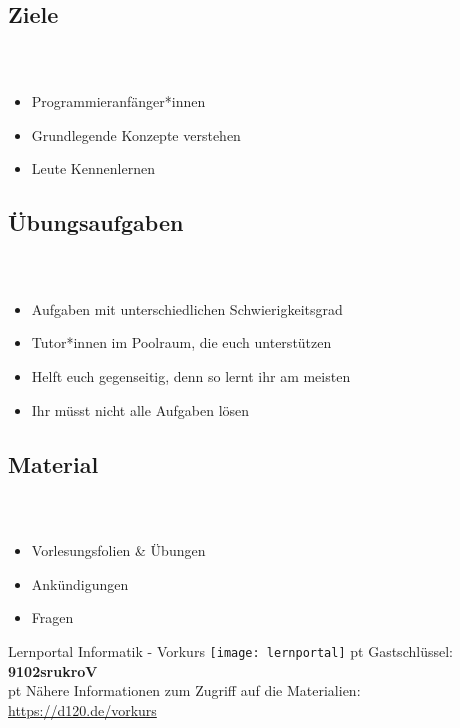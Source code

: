 \subsection{Ziele}
\begin{frame}
	\frametitle{\insertsectionhead \\ {\small \insertsubsectionhead}}
	\begin{itemize}
		\item Programmieranfänger*innen
		\item Grundlegende Konzepte verstehen
		\item Leute Kennenlernen
	\end{itemize}
\end{frame}

\subsection{Übungsaufgaben}
\begin{frame}
	\frametitle{\insertsectionhead \\ {\small \insertsubsectionhead}}
	\begin{itemize}
		\item Aufgaben mit unterschiedlichen Schwierigkeitsgrad
		\item Tutor*innen im Poolraum, die euch unterstützen
		\item Helft euch gegenseitig, denn so lernt ihr am meisten
		\item Ihr müsst nicht alle Aufgaben lösen
	\end{itemize}
\end{frame}

\subsection{Material}
\begin{frame}
	\frametitle{\insertsectionhead \\ {\small \insertsubsectionhead}}
	\begin{itemize}
		\item Vorlesungsfolien \& Übungen
		\item Ankündigungen
		\item Fragen
	\end{itemize}

	\begin{block}{Lernportal Informatik - Vorkurs}
		\texttt{[image: lernportal]}
		 pt
		\Huge{Gastschlüssel:} \textbf{9102srukroV}\\
		\normalsize
		 pt
		Nähere Informationen zum Zugriff auf die Materialien:\\
		\quad \href{https://d120.de/vorkurs}{https://d120.de/vorkurs}
	\end{block}
\end{frame}


